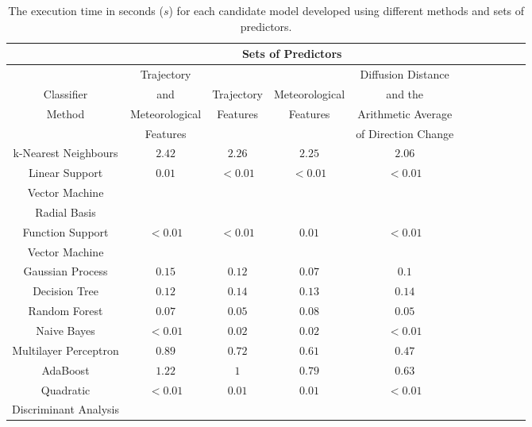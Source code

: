 \let\LaTeXcline\cline\documentclass[sn-mathphys-num]{sn-jnl}\let\cline\LaTeXcline
\begin{document}
\begin{table}[!ht]
    \centering
    \caption{The execution time in seconds ($s$) for each candidate model developed using different methods and sets of predictors.}
	\label{tab:time}
	\begin{tabular}{|c|c|c|c|c|c|c|c|c|c|c|}
		\hline
        & \multicolumn{4}{|c|}{Sets of Predictors} \\ \hline
         & Trajectory & & & Diffusion Distance \\
        Classifier & and & Trajectory & Meteorological & and the \\
        Method & Meteorological & Features & Features & Arithmetic Average \\
         & Features & & & of Direction Change \\ \hline
        k-Nearest Neighbours & $2.42$ & $2.26$ & $2.25$ & $2.06$ \\ \hline
        Linear Support & \multirow{2}{*}{$0.01$} & \multirow{2}{*}{$<0.01$} & \multirow{2}{*}{$<0.01$} & \multirow{2}{*}{$<0.01$} \\
        Vector Machine & & & & \\ \hline
        Radial Basis & & & & \\
        Function Support & $<0.01$ & $<0.01$ & $0.01$ & $<0.01$ \\
        Vector Machine & & & & \\ \hline
        Gaussian Process & $0.15$ & $0.12$ & $0.07$ & $0.1$ \\ \hline
        Decision Tree & $0.12$ & $0.14$ & $0.13$ & $0.14$ \\ \hline
        Random Forest & $0.07$ & $0.05$ & $0.08$ & $0.05$ \\ \hline
        Naive Bayes & $<0.01$ & $0.02$ & $0.02$ & $<0.01$ \\ \hline
        Multilayer Perceptron & $0.89$ & $0.72$ & $0.61$ & $0.47$ \\ \hline
        AdaBoost & $1.22$ & $1$ & $0.79$ & $0.63$ \\ \hline
        Quadratic & \multirow{2}{*}{$<0.01$} & \multirow{2}{*}{$0.01$} & \multirow{2}{*}{$0.01$} & \multirow{2}{*}{$<0.01$} \\
        Discriminant Analysis & & & & \\ \hline
	\end{tabular}
\end{table}
\end{document}
